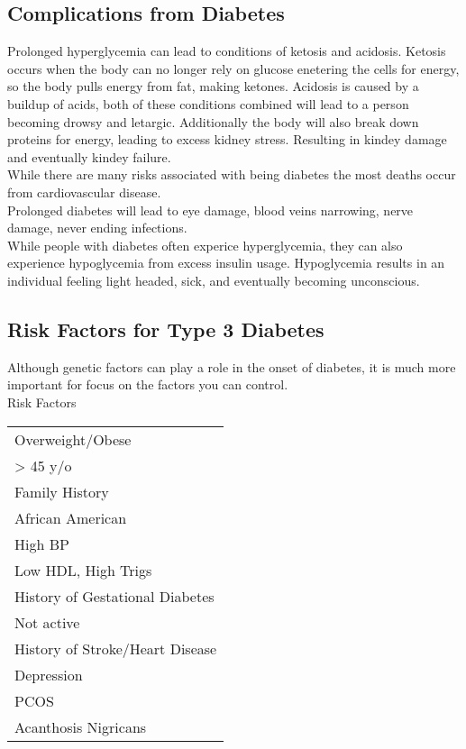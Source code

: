 \documentclass[letterpaper, 11pt]{article}
\begin{document}
\subsection{Complications from Diabetes}
\label{sec:orgada7011}
Prolonged hyperglycemia can lead to conditions of ketosis and acidosis. Ketosis occurs when the body can no longer rely on glucose enetering the cells for energy, so the body pulls energy from fat, making ketones. Acidosis is caused by a buildup of acids, both of these conditions combined will lead to a person becoming drowsy and letargic. Additionally the body will also break down proteins for energy, leading to excess kidney stress. Resulting in kindey damage and eventually kindey failure.\\
While there are many risks associated with being diabetes the most deaths occur from cardiovascular disease.\\
Prolonged diabetes will lead to eye damage, blood veins narrowing, nerve damage, never ending infections.\\
While people with diabetes often experice hyperglycemia, they can also experience hypoglycemia from excess insulin usage. Hypoglycemia results in an individual feeling light headed, sick, and eventually becoming unconscious.\\
\subsection{Risk Factors for Type 3 Diabetes}
\label{sec:org1b6acd4}
Although genetic factors can play a role in the onset of diabetes, it is much more important for focus on the factors you can control.\\
Risk Factors\\
\begin{center}
\begin{tabular}{l}
Overweight/Obese\\
> 45 y/o\\
Family History\\
African American\\
High BP\\
Low HDL, High Trigs\\
History of Gestational Diabetes\\
Not active\\
History of Stroke/Heart Disease\\
Depression\\
PCOS\\
Acanthosis Nigricans\\
\end{tabular}
\end{center}
\end{document}
